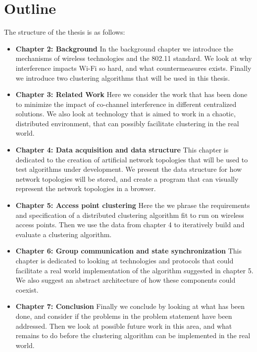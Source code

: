 \section{Outline}
The structure of the thesis is as follows:

\begin{itemize}
	\item \textbf{Chapter 2: Background} \newline
	In the background chapter we introduce the mechanisms of wireless technologies and the 802.11 standard. We look at why interference impacts 
		Wi-Fi so hard, and what countermeasures exists. Finally we introduce two clustering algorithms that will be used in this thesis. 

	\item \textbf{Chapter 3: Related Work} \newline
		Here we consider the work that has been done to minimize the impact of co-channel interference in different centralized solutions.
		We also look at technology that is aimed to work in a chaotic, distributed environment, that can possibly facilitate clustering in the real world.

	\item \textbf{Chapter 4: Data acquisition and data structure} \newline
		This chapter is dedicated to the creation of artificial network topologies that will be used to test algorithms under development.
		We present the data structure for how network topologies will be stored, and create a program that can visually represent the network topologies in a browser.

	\item \textbf{Chapter 5: Access point clustering}\newline
	Here the we phrase the requirements and specification of a distributed clustering algorithm fit to run on wireless access points.
	Then we use the data from chapter 4 to iteratively build and evaluate a clustering algorithm.

	\item \textbf{Chapter 6: Group communication and state synchronization} \newline
	This chapter is dedicated to looking at technologies and protocols that could facilitate a real world implementation of the algorithm suggested in chapter 5. 
	We also suggest an abstract architecture of how these components could coexist. 	

	\item \textbf{Chapter 7: Conclusion} \newline
	Finally we conclude by looking at what has been done, and consider if the problems in the problem statement have been addressed. Then we look at possible
		future work in this area, and what remains to do before the clustering algorithm can be implemented in the real world.  
\end{itemize}
%


